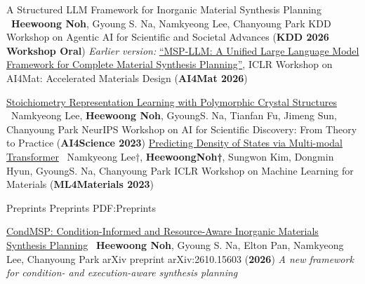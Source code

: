 \documentclass[letterpaper,MMMyyyy,nonstopmode]{simpleresumecv}
\begin{document}
\begin{Body}
\NumberedItem{[W3]}
A Structured LLM Framework for Inorganic Material Synthesis Planning
\newline
\ \textbf{Heewoong Noh}, Gyoung S. Na, Namkyeong Lee, Chanyoung Park
\newline
KDD Workshop on Agentic AI for Scientific and Societal Advances (\textbf{KDD 2026 Workshop Oral})
\newline
{\small \textit{Earlier version:}
\href{https://openreview.net/forum?id=O2irXCLp3q}
{``MSP-LLM: A Unified Large Language Model Framework for Complete
Material Synthesis Planning''},
ICLR Workshop on AI4Mat: Accelerated Materials Design (\textbf{AI4Mat 2026})}

\NumberedItem{[W2]}
\href{https://openreview.net/forum?id=DBiWSzlaGz}
{Stoichiometry Representation Learning with Polymorphic Crystal Structures}
\newline
\ Namkyeong Lee, \textbf{Heewoong Noh}, GyoungS. Na, Tianfan Fu, Jimeng Sun, Chanyoung Park
\newline 
NeurIPS Workshop on AI for Scientific Discovery: From Theory to Practice (\textbf{AI4Science 2023})
\NumberedItem{[W1]}
\href{https://arxiv.org/abs/2303.07000}
{Predicting Density of States via Multi-modal Transformer}
\newline
\ Namkyeong Lee†, \textbf{HeewoongNoh†}, Sungwon Kim, Dongmin Hyun, GyoungS. Na, Chanyoung Park
\newline
ICLR Workshop on Machine Learning for Materials (\textbf{ML4Materials 2023})


\endgroup


\SubSection
{Preprints}
{Preprints}
{PDF:Preprints}
\begingroup
\renewcommand{\MaxNumberedItem}{[8888]}

\Gap
\NumberedItem{[P1]}
\href{https://arxiv.org/abs/2610.15603}
{CondMSP: Condition-Informed and Resource-Aware Inorganic Materials Synthesis Planning}
\newline
\ \textbf{Heewoong Noh}, Gyoung S. Na, Elton Pan, Namkyeong Lee, Chanyoung Park
\newline
arXiv preprint arXiv:2610.15603 (\textbf{2026})
\newline
{\small \textit{A new framework for condition- and execution-aware synthesis planning}}


\end{Body}
\end{document}
